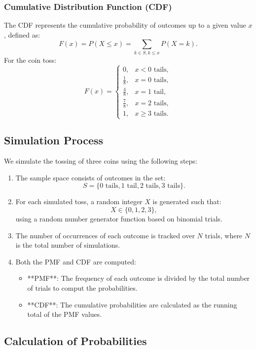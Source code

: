 \documentclass[journal]{IEEEtran}
\begin{document}
\subsubsection*{Cumulative Distribution Function (CDF)}
The CDF represents the cumulative probability of outcomes up to a given value \( x \), defined as:
\[
F(x) = P(X \leq x) = \sum_{k \in S, k \leq x} P(X = k).
\]
For the coin toss:
\[
F(x) = 
\begin{cases} 
0, & x < 0 \text{ tails}, \\
\frac{1}{8}, & x = 0 \text{ tails}, \\
\frac{4}{8}, & x = 1 \text{ tail}, \\
\frac{7}{8}, & x = 2 \text{ tails}, \\
1, & x \geq 3 \text{ tails}.
\end{cases}
\]

\subsection*{Simulation Process}
We simulate the tossing of three coins using the following steps:
\begin{enumerate}
    \item The sample space consists of outcomes in the set:
    \[
    S = \{0 \text{ tails}, 1 \text{ tail}, 2 \text{ tails}, 3 \text{ tails}\}.
    \]
    \item For each simulated toss, a random integer \( X \) is generated such that:
    \[
    X \in \{0, 1, 2, 3\},
    \]
    using a random number generator function based on binomial trials.
    \item The number of occurrences of each outcome is tracked over \( N \) trials, where \( N \) is the total number of simulations.
    \item Both the PMF and CDF are computed:
    \begin{itemize}
        \item **PMF**: The frequency of each outcome is divided by the total number of trials to comput the probabilities.
        \item **CDF**: The cumulative probabilities are calculated as the running total of the PMF values.
    \end{itemize}
\end{enumerate}

\subsection*{Calculation of Probabilities}
\end{document}
